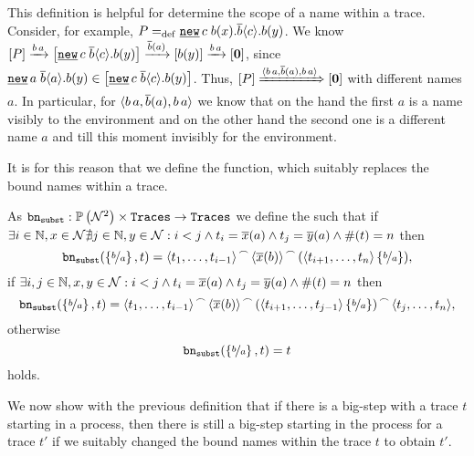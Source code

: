 This definition is helpful for determine the scope of a name within a trace. Consider, for example, $P\define{}\procres{c}{\inp{b}{x}.\out{b}{c}.\inp{b}{y}}$. We know $\ec{P}\intrans{b}{a}\ec{\procres{c}{\out{b}{c}.\inp{b}{y}}}\bouttrans{b}{a}\ec{\inp{b}{y}}\intrans{b}{a}\ec{\proczero}$, since $\procres{a}{\out{b}{a}.\inp{b}{y}}\in\ec{\procres{c}{\out{b}{c}.\inp{b}{y}}}$. Thus, $\left[P\right]\xRightarrow{\langle b\,a,\overline{b}(a),b\,a\rangle}\left[\mathbf{0}\right]$ with different names $a$. In particular, for $\langle b\,a,\overline{b}(a),b\,a\rangle$ we know that on the hand the first $a$ is a name visibly to the environment and on the other hand the second one is a different name $a$ and till this moment invisibly for the environment.

It is for this reason that we define the  function, which suitably replaces the bound names within a trace.

\begin{definition}
\label{def_bound_substitution}
As $\mathtt{bn}_{\mathtt{subst}}{}:\mathbb P\left(\mathcal N^2\right)\times\mathtt{Traces}\rightarrow\mathtt{Traces}$ we define the  such that\newline
if $\exists{} i\in\mathbb N{},x\in\mathcal N\nexists{}j\in\mathbb N,y\in\mathcal N: i<j\wedge{}t_i=\overline{x}(a)\wedge{}t_j=\overline{y}(a)\wedge\#(t)=n$ then
\[\mathtt{bn}_{\mathtt{subst}}(\left\{\nicefrac{b}{a}\right\},t)={\langle t_1,\ldots,t_{i-1}\rangle}^{\,\frown{}\,}{{\langle\overline{x}(b)\rangle}^{\,\frown{}\,}{(\langle t_{i+1},\ldots,t_n\rangle\left\{\nicefrac{b}{a}\right\})}},\]
if $\exists{} i,j\in\mathbb N{},x,y\in\mathcal N: i<j\wedge{}t_i=\overline{x}(a)\wedge{}t_j=\overline{y}(a)\wedge\#(t)=n$ then 
\[\mathtt{bn}_{\mathtt{subst}}(\left\{\nicefrac{b}{a}\right\},t)={\langle t_1,\ldots,t_{i-1}\rangle}^{\,\frown{}\,}{{\langle\overline{x}(b)\rangle}^{\,\frown{}\,}{{(\langle t_{i+1},\ldots,t_{j-1}\rangle\left\{\nicefrac{b}{a}\right\})}^{\,\frown{}\,}{\langle t_j,\ldots,t_n\rangle}}},\]
otherwise
\[\mathtt{bn}_{\mathtt{subst}}(\left\{\nicefrac{b}{a}\right\},t)=t\]
holds.
\end{definition}

We now show with the previous definition that if there is a big-step with a trace $t$ starting in a process, then there is still a big-step starting in the process for a trace $t'$ if we suitably changed the bound names within the trace $t$ to obtain $t'$.


